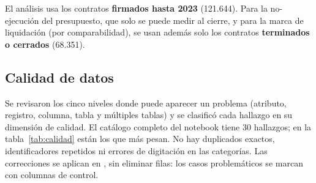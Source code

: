 \documentclass[11pt,a4paper]{article}
\begin{document}
El análisis usa los contratos \textbf{firmados hasta 2023} (121.644). Para la no-ejecución del presupuesto, que solo
se puede medir al cierre, y para la marca de liquidación (por comparabilidad), se usan además solo los contratos
\textbf{terminados o
cerrados} (68.351).

\subsection{Calidad de datos}

Se revisaron los cinco niveles donde puede aparecer un problema (atributo, registro, columna, tabla y múltiples
tablas) y se clasificó cada hallazgo en su dimensión de calidad. El catálogo completo del notebook tiene 30
hallazgos; en la tabla~\ref{tab:calidad} están los que más pesan. No hay duplicados exactos,
identificadores repetidos ni errores de digitación en las categorías. Las correcciones se aplican en
, sin eliminar filas: los casos problemáticos se marcan con columnas de control.
\end{document}
